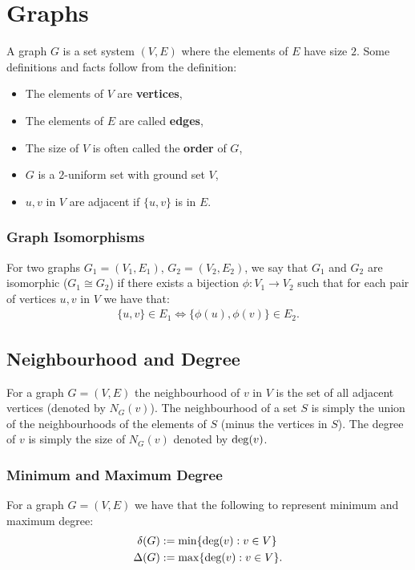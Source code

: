 \section{Graphs}

A graph $G$ is a set system $(V, E)$ where the elements of $E$ have
size $2$. Some definitions and facts follow from the definition:
\begin{itemize}
  \item The elements of $V$ are \textbf{vertices},
  \item The elements of $E$ are called \textbf{edges},
  \item The size of $V$ is often called the \textbf{order} of $G$,
  \item $G$ is a $2$-uniform set with ground set $V$,
  \item $u, v$ in $V$ are adjacent if $\{u, v\}$ is in $E$.
\end{itemize}  

\subsubsection{Graph Isomorphisms}

For two graphs $G_1 = (V_1, E_1)$, $G_2 = (V_2, E_2)$, we say that
$G_1$ and $G_2$ are isomorphic ($G_1 \cong G_2$) if there exists a
bijection $\phi : V_1 \to V_2$ such that for each pair of vertices
$u, v$ in $V$ we have that: \begin{gather*}
  \{u, v\} \in E_1 \Longleftrightarrow \{\phi(u), \phi(v)\} \in E_2.
\end{gather*}

\subsection{Neighbourhood and Degree}

For a graph $G = (V, E)$ the neighbourhood of $v$ in $V$ 
is the set of all adjacent vertices (denoted by $N_G(v)$). The
neighbourhood of a set $S$ is simply the union of the neighbourhoods
of the elements of $S$ (minus the vertices in $S$).
The degree of $v$ is simply the size of $N_G(v)$ denoted 
by $\operatorname{deg}(v)$.

\subsubsection{Minimum and Maximum Degree}

For a graph $G = (V, E)$ we have that the following to represent
minimum and maximum degree: \begin{align*}
  \delta(G) &:= \operatorname{min}\{\text{deg}(v) : v \in V\} \\
  \Delta(G) &:= \operatorname{max}\{\text{deg}(v) : v \in V\}.
\end{align*}

